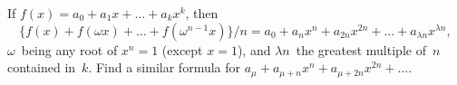 If $f(x) = a_{0} + a_{1}x + \dots + a_{k}x^{k}$, then
\[
\{f(x) + f(\omega x) + \dots + f(\omega^{n-1}x)\}/n
  = a_{0} + a_{n}x^{n} + a_{2n}x^{2n} + \dots + a_{\lambda n}x^{\lambda n},
\]
$\omega$~being any root of $x^{n} = 1$ (except $x = 1$), and $\lambda n$~the greatest multiple of~$n$
contained in~$k$. Find a similar formula for $a_{\mu} + a_{\mu+n}x^{n} + a_{\mu+2n}x^{2n} + \dots$.


